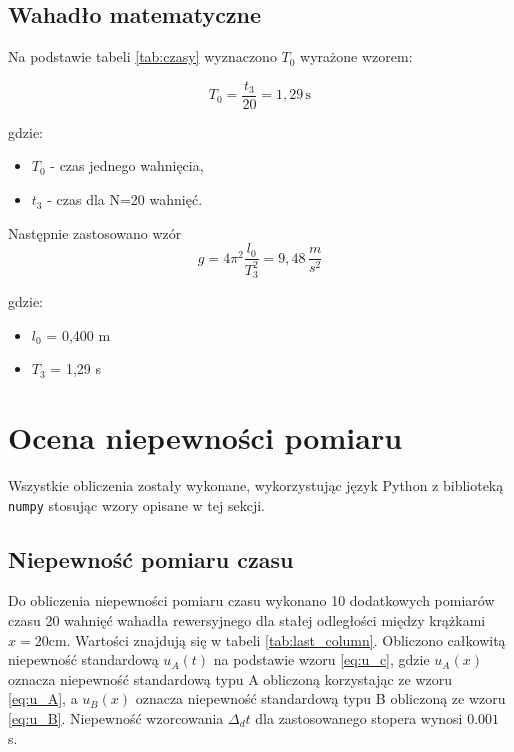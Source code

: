 \documentclass[a4paper,12pt]{article}
\begin{document}
\subsection{Wahadło matematyczne}
Na podstawie tabeli \ref{tab:czasy} wyznaczono $T_0$ wyrażone wzorem:\par
\begin{equation}
  T_0=\frac{t_3}{20}=1,29\,\text{s}
\end{equation} \par
gdzie:
\begin{itemize}
  \item \( T_0 \) - czas jednego wahnięcia,
  \item \( t_3 \) - czas dla N=20 wahnięć.
\end{itemize}\par
Następnie zastosowano wzór
\begin{equation}
  g=4\pi^2\frac{l_0}{T_3^2}=9,48\,\frac{m}{s^2}
\end{equation} \par
gdzie:
\begin{itemize}
  \item \( l_0 \) = 0,400 m
  \item \( T_3 \) = 1,29 s
\end{itemize}\par

\section{Ocena niepewności pomiaru}

Wszystkie obliczenia zostały wykonane, wykorzystując język Python z biblioteką \texttt{numpy} stosując wzory opisane w tej sekcji.

\subsection{Niepewność pomiaru czasu}

Do obliczenia niepewności pomiaru czasu wykonano 10 dodatkowych pomiarów czasu 20 wahnięć wahadła rewersyjnego dla stałej odległości między krążkami $x=20 \text{cm}$. Wartości znajdują się w tabeli \ref{tab:last_column}. Obliczono całkowitą niepewność standardową $u_A(t)$ na podstawie wzoru \ref{eq:u_c}, gdzie $u_A(x)$ oznacza niepewność standardową typu A obliczoną korzystając ze wzoru \ref{eq:u_A}, a $u_B(x)$ oznacza niepewność standardową typu B obliczoną ze wzoru \ref{eq:u_B}. Niepewność wzorcowania $\Delta_d t$ dla zastosowanego stopera wynosi $0.001$ s.
\end{document}
